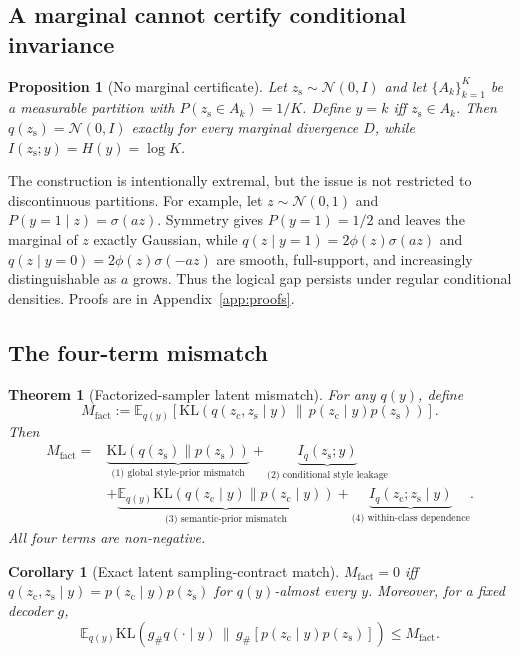 \documentclass{article}
\newtheorem{theorem}{Theorem}
\newtheorem{corollary}{Corollary}
\newtheorem{proposition}{Proposition}
\newcommand{\zc}{z_{\mathrm{c}}}
\newcommand{\zs}{z_{\mathrm{s}}}
\newcommand{\KL}{\mathrm{KL}}
\begin{document}
\subsection{A marginal cannot certify conditional invariance}

\begin{proposition}[No marginal certificate]
\label{prop:nocert}
Let $\zs\sim\mathcal N(0,I)$ and let $\{A_k\}_{k=1}^K$ be a measurable
partition with $P(\zs\in A_k)=1/K$.  Define $y=k$ iff $\zs\in A_k$.  Then
$q(\zs)=\mathcal N(0,I)$ exactly for every marginal divergence $D$, while
$I(\zs;y)=H(y)=\log K$.
\end{proposition}

The construction is intentionally extremal, but the issue is not restricted
to discontinuous partitions.  For example, let $z\sim\mathcal N(0,1)$ and
$P(y=1\mid z)=\sigma(az)$.  Symmetry gives $P(y=1)=1/2$ and leaves the
marginal of $z$ exactly Gaussian, while
$q(z\mid y=1)=2\phi(z)\sigma(az)$ and
$q(z\mid y=0)=2\phi(z)\sigma(-az)$ are smooth, full-support, and increasingly
distinguishable as $a$ grows.  Thus the logical gap persists under regular
conditional densities.  Proofs are in Appendix~\ref{app:proofs}.

\subsection{The four-term mismatch}

\begin{theorem}[Factorized-sampler latent mismatch]
\label{thm:decomp}
For any $q(y)$, define
\begin{equation}
M_{\mathrm{fact}}:=\mathbb E_{q(y)}\!\left[
\KL\!\left(q(\zc,\zs\mid y)\,\|\,p(\zc\mid y)p(\zs)\right)\right].
\end{equation}
Then
\begin{align}
M_{\mathrm{fact}}={}&
\underbrace{\KL(q(\zs)\|p(\zs))}_{\text{(1) global style-prior mismatch}}
+\underbrace{I_q(\zs;y)}_{\text{(2) conditional style leakage}}\nonumber\\
&+\underbrace{\mathbb E_{q(y)}\KL(q(\zc\mid y)\|p(\zc\mid y))}_{\text{(3) semantic-prior mismatch}}
+\underbrace{I_q(\zc;\zs\mid y)}_{\text{(4) within-class dependence}}.
\label{eq:decomp}
\end{align}
All four terms are non-negative.
\end{theorem}

\begin{corollary}[Exact latent sampling-contract match]
\label{cor:valid}
$M_{\mathrm{fact}}=0$ iff
$q(\zc,\zs\mid y)=p(\zc\mid y)p(\zs)$ for $q(y)$-almost every $y$.
Moreover, for a fixed decoder $g$,
\begin{equation}
\mathbb E_{q(y)}\KL\!\left(g_\#q(\cdot\mid y)\,\|\,
g_\#[p(\zc\mid y)p(\zs)]\right)\le M_{\mathrm{fact}}.
\end{equation}
\end{corollary}
\end{document}
